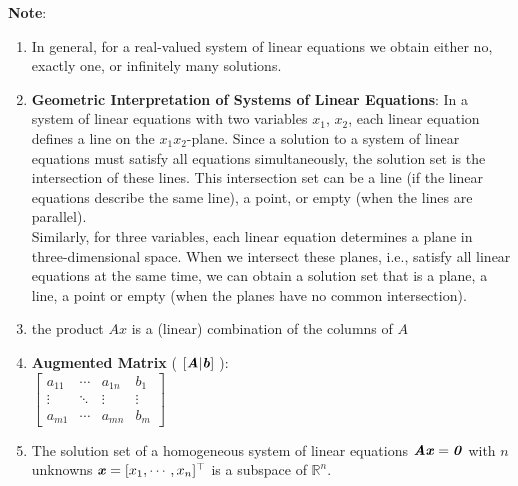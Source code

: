 \begin{enumerate}
    
    
\end{enumerate}


\vspace{0.5cm}
\textbf{Note}:
\begin{enumerate}
    \item In general, for a real-valued system of linear equations we obtain either no, exactly one, or infinitely many solutions. 
    \hfill \cite{mfml/book/mml/Deisenroth-Faisal-Ong}

    \item \textbf{Geometric Interpretation of Systems of Linear Equations}: 
    In a system of linear equations with two variables $x_1$, $x_2$, each linear equation defines a line on the $x_1x_2$-plane. Since a solution to a system of linear equations must satisfy all equations simultaneously, the solution set is the intersection of these lines. This intersection set can be a line (if the linear equations describe the same line), a point, or empty (when the lines are parallel).
    \hfill \cite{mfml/book/mml/Deisenroth-Faisal-Ong}
    \\
    Similarly, for three variables, each linear equation determines a plane in three-dimensional space. When we intersect these planes, i.e., satisfy all linear equations at the same time, we can obtain a solution set that is a plane, a line, a point or empty (when the planes have no common intersection).
    \hfill \cite{mfml/book/mml/Deisenroth-Faisal-Ong}

    \item the product $Ax$ is a (linear) combination of the columns of $A$
    \hfill \cite{mfml/book/mml/Deisenroth-Faisal-Ong}

    \item \textbf{Augmented Matrix} ( $\left[\text{\textbf{\textit{A}}}|\text{\textbf{\textit{b}}}\right]$ ): 
    \\[0.2cm]
    $
        \left[
        \begin{array}{ccc|c}
            a_{11} & \cdots & a_{1n} & b_{1}\\
            \vdots & \ddots & \vdots & \vdots \\
            a_{m1} & \cdots & a_{mn} & b_{m}
        \end{array}
        \right]
    $

    \item The solution set of a homogeneous system of linear equations $\text{\textbf{\textit{Ax}}} = \text{\textbf{\textit{0}}}$ with $n$ unknowns $\text{\textbf{\textit{x}}} = [x_1, \cdots , x_n]^\top$ is a subspace of $\mathbb{R}^n$.
    \hfill \cite{mfml/book/mml/Deisenroth-Faisal-Ong}


\end{enumerate}
